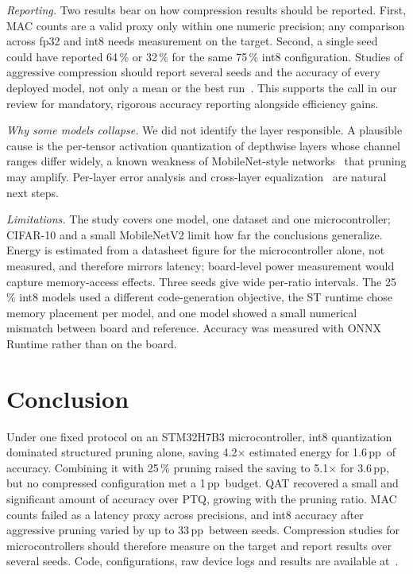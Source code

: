 \documentclass[conference]{IEEEtran}
\newcommand{\pp}{\,pp}
\begin{document}
\textit{Reporting.} Two results bear on how compression results should be reported. First, MAC counts are a valid proxy only within one numeric precision; any comparison across fp32 and int8 needs measurement on the target. Second, a single seed could have reported 64\,\% or 32\,\% for the same 75\,\% int8 configuration. Studies of aggressive compression should report several seeds and the accuracy of every deployed model, not only a mean or the best run~\cite{bouthillier2021variance}. This supports the call in our review for mandatory, rigorous accuracy reporting alongside efficiency gains.

\textit{Why some models collapse.} We did not identify the layer responsible. A plausible cause is the per-tensor activation quantization of depthwise layers whose channel ranges differ widely, a known weakness of MobileNet-style networks~\cite{krishnamoorthi2018whitepaper,nagel2019dfq} that pruning may amplify. Per-layer error analysis and cross-layer equalization~\cite{nagel2019dfq} are natural next steps.

\textit{Limitations.} The study covers one model, one dataset and one microcontroller; CIFAR-10 and a small MobileNetV2 limit how far the conclusions generalize. Energy is estimated from a datasheet figure for the microcontroller alone, not measured, and therefore mirrors latency; board-level power measurement would capture memory-access effects. Three seeds give wide per-ratio intervals. The 25\,\% int8 models used a different code-generation objective, the ST runtime chose memory placement per model, and one model showed a small numerical mismatch between board and reference. Accuracy was measured with ONNX Runtime rather than on the board.

\section{Conclusion}
Under one fixed protocol on an STM32H7B3 microcontroller, int8 quantization dominated structured pruning alone, saving 4.2$\times$ estimated energy for 1.6\pp\ of accuracy. Combining it with 25\,\% pruning raised the saving to 5.1$\times$ for 3.6\pp, but no compressed configuration met a 1\pp\ budget. QAT recovered a small and significant amount of accuracy over PTQ, growing with the pruning ratio. MAC counts failed as a latency proxy across precisions, and int8 accuracy after aggressive pruning varied by up to 33\pp\ between seeds. Compression studies for microcontrollers should therefore measure on the target and report results over several seeds. Code, configurations, raw device logs and results are available at~\cite{repo}.



\end{document}
